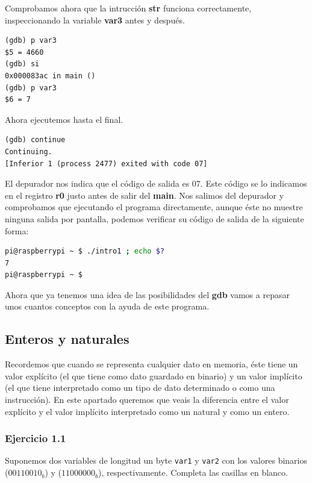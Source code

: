 Comprobamos ahora que la intrucción {\bf str} funciona correctamente,
inspeccionando la variable {\bf var3} antes y después.

\begin{lstlisting}
(gdb) p var3
$5 = 4660
(gdb) si
0x000083ac in main ()
(gdb) p var3
$6 = 7
\end{lstlisting}

Ahora ejecutemos hasta el final.

\begin{lstlisting}
(gdb) continue
Continuing.
[Inferior 1 (process 2477) exited with code 07]
\end{lstlisting}

El depurador nos indica que el código de salida es 07. Este código
se lo indicamos en el registro {\bf r0} justo antes de salir del {\bf main}.
Nos salimos del depurador y comprobamos que ejecutando el programa
directamente, aunque éste no muestre ninguna salida por pantalla, podemos
verificar su código de salida de la siguiente forma:

\begin{lstlisting}[language=bash]
pi@raspberrypi ~ $ ./intro1 ; echo $?
7
pi@raspberrypi ~ $
\end{lstlisting}

Ahora que ya tenemos una idea de las posibilidades del {\bf gdb}
vamos a repasar unos cuantos conceptos con la ayuda de este programa.

\subsection{Enteros y naturales}

Recordemos que cuando se representa cualquier dato en memoria, éste tiene un
valor explícito (el que tiene como dato guardado en binario) y un
valor implícito (el que tiene interpretado como un tipo de dato
determinado o como una instrucción). En este apartado queremos que veais la
diferencia entre el valor explícito y el valor implícito interpretado como
un natural y como un entero.

\subsubsection{Ejercicio 1.1}
Suponemos dos variables de longitud un byte {\tt var1}
y {\tt var2} con los valores binarios ($00110010_b$) y ($11000000_b$),
respectivamente. Completa las casillas en blanco.

